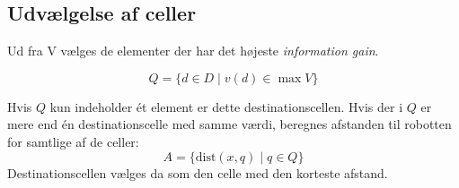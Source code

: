 \subsection{Udvælgelse af celler }
Ud fra V vælges de elementer der har det højeste \textit{information gain}. 


\begin{equation}
Q = \{ d \in D \mid v(d) \in \max V \}
\end{equation}

Hvis $ Q $ kun indeholder ét element er dette destinationscellen. 
Hvis der i $Q$ er mere end én destinationscelle med samme værdi, beregnes afstanden til robotten for samtlige af de celler:
\begin{equation}
A = \{ \text{dist}(x,q) \mid q \in Q \}
\end{equation}
Destinationscellen vælges da som den celle med den korteste afstand.
